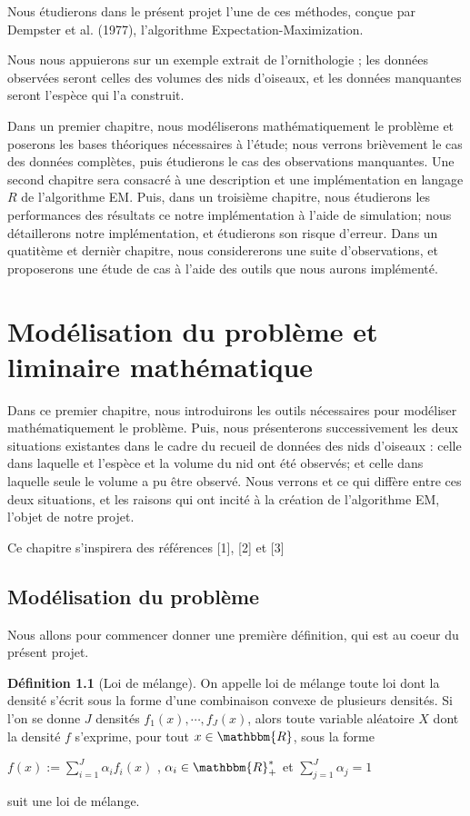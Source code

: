 \documentclass[frenchb]{report}
\newcommand{\R}{\mathbbm{R}}
\newcommand{\1}{\mathbbm{1}}
\theoremstyle{definition}\newtheorem{defn}{Définition}
\theoremstyle{definition}\newtheorem{exm}{Exemple}
\theoremstyle{definition}\newtheorem{nota}{Notation}
\theoremstyle{definition}\newtheorem{rem}{Remarque}
\begin{document}
Nous étudierons dans le présent projet l’une de ces méthodes, conçue par Dempster et al. (1977), l’algorithme Expectation-Maximization.  

Nous nous appuierons sur un exemple extrait de l’ornithologie ; les données observées seront celles des volumes des nids d’oiseaux, et les données manquantes seront l’espèce qui l’a construit.

Dans un premier chapitre, nous modéliserons mathématiquement le problème et poserons les bases théoriques nécessaires à l’étude; nous verrons brièvement le cas des données complètes, puis étudierons le cas des observations manquantes. Une second chapitre sera consacré à une description et une implémentation en langage $R$ de l’algorithme EM. Puis, dans un troisième chapitre, nous étudierons les performances des résultats ce notre implémentation à l'aide de simulation; nous détaillerons notre implémentation, et étudierons son risque d'erreur. Dans un quatitème et dernièr chapitre, nous considererons une suite d'observations, et proposerons une étude de cas à l'aide des outils que nous aurons implémenté.

\pagebreak


\chapter{Modélisation du problème et liminaire mathématique}
Dans ce premier chapitre, nous introduirons les outils nécessaires pour modéliser mathématiquement le problème. Puis, nous présenterons successivement les deux situations existantes dans le cadre du recueil de données des nids d'oiseaux : celle dans laquelle et l'espèce et la volume du nid ont été observés; et celle dans laquelle seule le volume a pu être observé.
Nous verrons et ce qui diffère entre ces deux situations, et les raisons qui ont incité à la création de l’algorithme EM, l’objet de notre projet. 

Ce chapitre s'inspirera des références [1], [2] et [3]

\section{Modélisation du problème}

Nous allons pour commencer donner une première définition, qui est au coeur du présent projet.

\begin{defn}[Loi de mélange]
On appelle loi de mélange toute loi dont la densité s'écrit sous la forme d'une combinaison convexe de plusieurs densités. Si l'on se donne $J$  densités $f_1(x), \cdots, f_J(x)$, alors toute variable aléatoire $X$ dont la densité $f$ s'exprime, pour tout $x\in\R$, sous la forme
\begin{center}
$f(x) := \displaystyle\sum_{i=1}^J \alpha_i f_i(x)$ , $\alpha_i \in\R_+^*$ et $\displaystyle\sum_{j=1}^J\alpha_j=1$ \end{center}
suit une loi de mélange.
\end{defn}
\end{document}
